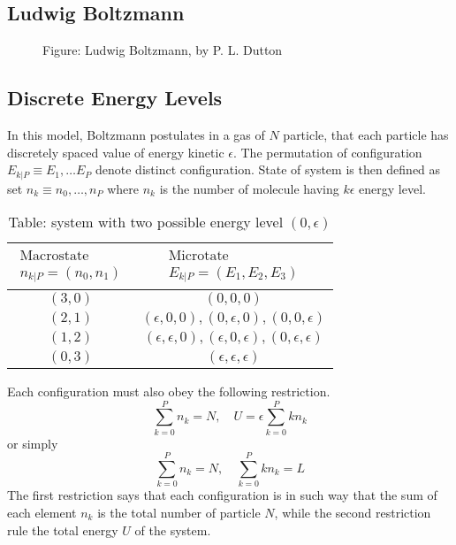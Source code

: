 \documentclass[../../../Main.tex]{subfiles}
\begin{document}
\subsection*{Ludwig Boltzmann}
\begin{figure*}[h]
    \centering
    \caption*{Figure: Ludwig Boltzmann, by P. L. Dutton}
\end{figure*}
\subsection*{Discrete Energy Levels}
In this model, Boltzmann postulates in a gas of $N$ particle, that each particle has discretely spaced value of energy kinetic $\epsilon$. The permutation of configuration $E_{k|P}\equiv E_1,\dots E_P$ denote distinct configuration. State of system is then defined as set $n_k\equiv n_0,\dots, n_P$ where $n_k$ is the number of molecule having $k\epsilon$ energy level.

\begin{table}[h]
    \centering
    \caption*{Table: system with two possible energy level $(0, \epsilon)$}
    \begin{tabular}{cc} 
        \toprule
        $\begin{array}{c}\text{Macrostate} \\n_{k|P}=(n_0,n_1)\end{array}$  &  $\begin{array}{c}\text{Microtate} \\ E_{k|P}=(E_1 , E_2 , E_3 )\end{array}$ \\
        \midrule
        $(3, 0)$&$(0, 0, 0)$\\
        $(2, 1)$&$(\epsilon, 0, 0), (0, \epsilon, 0), (0, 0, \epsilon)$\\
        $(1, 2)$&$(\epsilon, \epsilon, 0), (\epsilon, 0, \epsilon), (0, \epsilon, \epsilon)$\\
        $(0, 3)$&$(\epsilon, \epsilon, \epsilon)$\\
        \bottomrule
    \end{tabular}
\end{table}

Each configuration must also obey the following restriction.
\begin{equation*}
    \sum_{k=0}^{P}n_k=N,\quad U=\epsilon\sum_{k=0}^{P} kn_k
\end{equation*}
or simply
\begin{equation*}
    \sum_{k=0}^{P}n_k=N,\quad \sum_{k=0}^{P} kn_k=L
\end{equation*}
The first restriction says that each configuration is in such way that the sum of each element $n_k$ is the total number of particle $N$, while the second restriction rule the total energy $U$ of the system.
\end{document}
